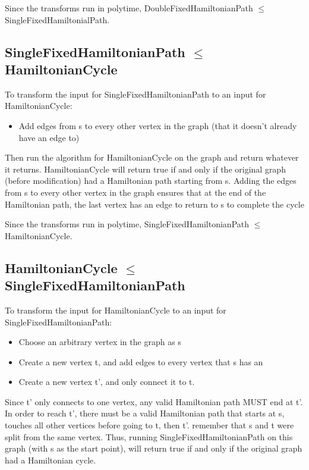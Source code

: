 \documentclass[a4paper]{article}
\begin{document}
Since the transforms run in polytime, DoubleFixedHamiltonianPath $\leq$ SingleFixedHamiltonialPath.

\subsection{SingleFixedHamiltonianPath $\leq$ HamiltonianCycle}
To transform the input for SingleFixedHamiltonianPath to an input for HamiltonianCycle:

\begin{itemize}
    \item Add edges from s to every other vertex in the graph (that it doesn't already have an edge to)
\end{itemize}

Then run the algorithm for HamiltonianCycle on the graph and return whatever it returns. HamiltonianCycle will return true if and only if the original graph (before modification) had a Hamiltonian path starting from s. Adding the edges from s to every other vertex in the graph ensures that at the end of the Hamiltonian path, the last vertex has an edge to return to s to complete the cycle

Since the transforms run in polytime, SingleFixedHamiltonianPath $\leq$ HamiltonianCycle.

\subsection{HamiltonianCycle $\leq$ SingleFixedHamiltonianPath}
To transform the input for HamiltonianCycle to an input for SingleFixedHamiltonianPath:

\begin{itemize}
    \item Choose an arbitrary vertex in the graph as s
    \item Create a new vertex t, and add edges to every vertex that s has an 
    \item Create a new vertex t', and only connect it to t.
\end{itemize}

Since t' only connects to one vertex, any valid Hamiltonian path MUST end at t'. In order to reach t', there must be a valid Hamiltonian path that starts at s, touches all other vertices before going to t, then t'. remember that s and t were split from the same vertex. Thus, running SingleFixedHamiltonianPath on this graph (with s as the start point), will return true if and only if the original graph had a Hamiltonian cycle.
\end{document}

